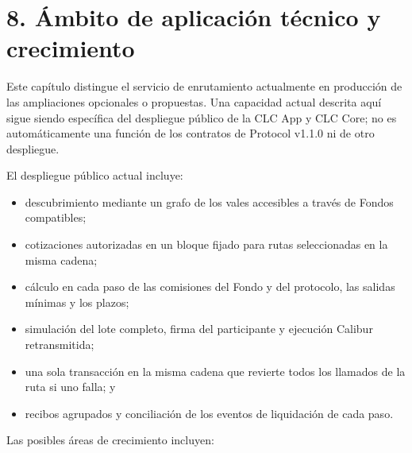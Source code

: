 \documentclass[11pt]{article}
\begin{document}
\section*{8. Ámbito de aplicación técnico y crecimiento}

Este capítulo distingue el servicio de enrutamiento actualmente en producción de las ampliaciones opcionales o propuestas. Una capacidad actual descrita aquí sigue siendo específica del despliegue público de la CLC App y CLC Core; no es automáticamente una función de los contratos de Protocol v1.1.0 ni de otro despliegue.

El despliegue público actual incluye:

\begin{itemize}[leftmargin=*]
\item descubrimiento mediante un grafo de los vales accesibles a través de Fondos compatibles;
\item cotizaciones autorizadas en un bloque fijado para rutas seleccionadas en la misma cadena;
\item cálculo en cada paso de las comisiones del Fondo y del protocolo, las salidas mínimas y los plazos;
\item simulación del lote completo, firma del participante y ejecución Calibur retransmitida;
\item una sola transacción en la misma cadena que revierte todos los llamados de la ruta si uno falla; y
\item recibos agrupados y conciliación de los eventos de liquidación de cada paso.
\end{itemize}
Las posibles áreas de crecimiento incluyen:
\end{document}
